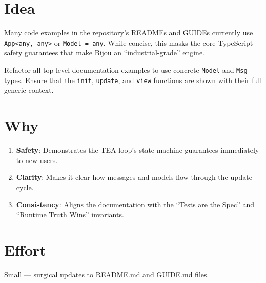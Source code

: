 \section{Idea}\label{record-298-idea}

Many code examples in the repository's READMEs and GUIDEs currently use \texttt{A\allowbreak{}p\allowbreak{}p\allowbreak{}<\allowbreak{}a\allowbreak{}n\allowbreak{}y\allowbreak{},\allowbreak{} \allowbreak{}a\allowbreak{}n\allowbreak{}y\allowbreak{}>} or \texttt{M\allowbreak{}o\allowbreak{}d\allowbreak{}e\allowbreak{}l\allowbreak{} \allowbreak{}=\allowbreak{} \allowbreak{}a\allowbreak{}n\allowbreak{}y}. While concise, this masks the core TypeScript safety guarantees that make Bijou an ``industrial-grade'' engine.

Refactor all top-level documentation examples to use concrete \texttt{M\allowbreak{}o\allowbreak{}d\allowbreak{}e\allowbreak{}l} and \texttt{M\allowbreak{}s\allowbreak{}g} types. Ensure that the \texttt{i\allowbreak{}n\allowbreak{}i\allowbreak{}t}, \texttt{u\allowbreak{}p\allowbreak{}d\allowbreak{}a\allowbreak{}t\allowbreak{}e}, and \texttt{v\allowbreak{}i\allowbreak{}e\allowbreak{}w} functions are shown with their full generic context.

\section{Why}\label{record-298-why}

\begin{enumerate}
\def\labelenumi{\arabic{enumi}.}
\tightlist
\item
  \textbf{Safety}: Demonstrates the TEA loop's state-machine guarantees immediately to new users.
\item
  \textbf{Clarity}: Makes it clear how messages and models flow through the update cycle.
\item
  \textbf{Consistency}: Aligns the documentation with the ``Tests are the Spec'' and ``Runtime Truth Wins'' invariants.
\end{enumerate}

\section{Effort}\label{record-298-effort}

Small --- surgical updates to README.md and GUIDE.md files.

